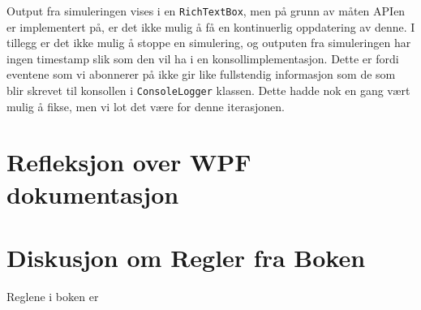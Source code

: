 \documentclass[12pt]{article}
\begin{document}
Output fra simuleringen vises i en \texttt{RichTextBox}, men på grunn av måten APIen er implementert på, 
er det ikke mulig å få en kontinuerlig oppdatering av denne. I tillegg er det ikke mulig å stoppe en simulering,
og outputen fra simuleringen har ingen timestamp slik som den vil ha i en konsollimplementasjon. Dette er fordi eventene
som vi abonnerer på ikke gir like fullstendig informasjon som de som blir skrevet til konsollen i \texttt{ConsoleLogger} 
klassen. Dette hadde nok en gang vært mulig å fikse, men vi lot det være for denne iterasjonen.
\section{Refleksjon over WPF dokumentasjon}


\section{Diskusjon om Regler fra Boken}

Reglene i boken er 
\end{document}
